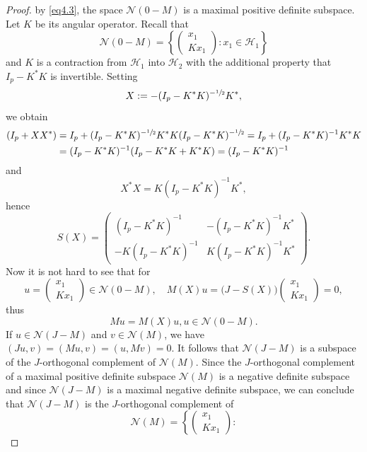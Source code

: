 \documentclass[10pt,a4paper]{amsart}
\begin{document}
\begin{proof}
by \eqref{eq4.3}, the space $\mathscr N(0-M)$ is a maximal positive
definite subspace. Let $K$ be its angular operator. Recall that
\[
  \mathscr N(0-M) = \left\{
     \begin{pmatrix} x_{1} \\ Kx_{1} \end{pmatrix}
      : x_{1}\in\mathscr H_{1} \right\}
\]  
and $K$ is a contraction from $\mathscr H_{1}$ into $\mathscr H_{2}$
with the additional property that $I_{p}-K^{\ast}K$ is invertible.
Setting
\[
X:=-(I_{p}-K^{\ast}K)^{-\sfrac{1}{2}}K^{\ast},
\]
we obtain
\begin{align*}
(I_{p}+XX^{\ast}) & =
  I_{p}+(I_{p}-K^{\ast}K)^{-\sfrac{1}{2}}K^{\ast}K
  (I_{p}-K^{\ast}K)^{-\sfrac{1}{2}} 
   = I_{p} + (I_{p}-K^{\ast}K)^{-1} K^{\ast}K \\                    
 & = (I_{p}-K^{\ast}K)^{-1}(I_{p}-K^{\ast}K + K^{\ast}K)
   = (I_{p}-K^{\ast}K)^{-1}
\end{align*}  
and 
\[
X^{\ast}X = K(I_{p}-K^{\ast}K)^{-1}K^{\ast},
\]
hence   
\[
  S(X)=
  \begin{pmatrix}
    (I_{p}-K^{\ast}K)^{-1}    & -(I_{p}-K^{\ast}K)^{-1}K^{\ast} \\
    -K (I_{p}-K^{\ast}K)^{-1} & K (I_{p}-K^{\ast}K)^{-1} K^{\ast}
  \end{pmatrix}.
\]
Now it is not hard to see that for 
\[
u = \begin{pmatrix} x_{1} \\ K x_{1} \end{pmatrix}
    \in\mathscr N(0-M),\quad
M(X)u = \bigl(J-S(X)\bigr) \begin{pmatrix} x_{1} \\ K x_{1} \end{pmatrix}=0,
\]  
thus
\begin{equation}
\label{eq5.5} 
  Mu = M(X)u, u\in\mathscr N(0-M).
\end{equation}
If $u\in\mathscr N(J-M)$ and $v\in\mathscr N(M)$, we have
$(Ju,v)=(Mu,v)=(u,Mv)=0$. It follows that $\mathscr N(J-M)$ is a
subspace of the $J$-orthogonal complement of $\mathscr N(M)$. Since
the $J$-orthogonal complement of a maximal positive definite subspace
$\mathscr N(M)$ is a negative definite subspace and since $\mathscr
N(J-M)$ is a maximal negative definite subspace, we can conclude
that $\mathscr N(J-M)$ is the $J$-orthogonal complement of
\[
 \mathscr N(M) =
 \left\{ \begin{pmatrix} x_{1}\\ K x_{1} \end{pmatrix} :
\]
\end{proof}
\end{document}
